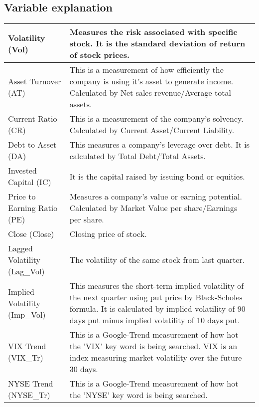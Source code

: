 \documentclass[a4paper]{article}
\begin{document}
\subsection{Variable explanation}
\begin{center}
\begin{tabular}{ |p{5cm} | p{10cm} | }
 \hline
Volatility (Vol) &  Measures the risk associated with specific stock. It is the standard deviation of return of stock prices. \\
 \hline
Asset Turnover (AT) & This is a measurement of how efficiently the company is using it's asset to generate income. Calculated by Net sales revenue/Average total assets. \\
 \hline
Current Ratio (CR) & This is a measurement of the company's solvency. Calculated by Current Asset/Current Liability.\\
 \hline
Debt to Asset (DA) & This measures a company's leverage over debt. It is calculated by Total Debt/Total Assets.\\
 \hline
Invested Capital (IC) & It is the capital raised by issuing bond or equities.\\
 \hline
Price to Earning Ratio (PE) & Measures a company's value or earning potential. Calculated by Market Value per share/Earnings per share.\\
 \hline
Close (Close) & Closing price of stock.\\
 \hline
Lagged Volatility (Lag\_Vol) & The volatility of the same stock from last quarter.\\
 \hline
Implied Volatility (Imp\_Vol) & This measures the short-term implied volatility of the next quarter using put price by Black-Scholes formula. It is calculated by implied volatility of 90 days put minus implied volatility of 10 days put.\\
 \hline
VIX Trend (VIX\_Tr) & This is a Google-Trend measurement of how hot the 'VIX' key word is being searched. VIX is an index measuring market volatility over the future 30 days.\\
 \hline
NYSE Trend (NYSE\_Tr) & This is a Google-Trend measurement of how hot the 'NYSE' key word is being searched.\\
\hline
\end{tabular}
\end{center}
\end{document}
